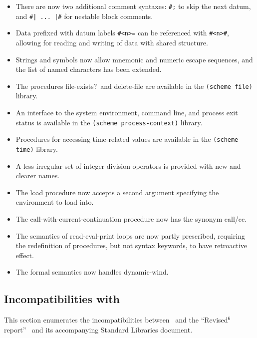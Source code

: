 \begin{itemize}
\item There are now two additional comment syntaxes: {\tt \#;} to
skip the next datum, and {\tt \#| ... |\#}
for nestable block comments.

\item Data prefixed with datum labels {\tt \#<n>=} can be referenced
with {\tt \#<n>\#}, allowing for reading and writing of data with
shared structure.

\item Strings and symbols now allow mnemonic and numeric escape
sequences, and the list of named characters has been extended.

\item The procedures {\cf file-exists?}\ and {\cf delete-file} are available in the
{\tt (scheme file)} library.

\item An interface to the system environment, command line, and process exit status is
available in the {\tt (scheme process-context)} library.

\item Procedures for accessing time-related values are available in the
{\tt (scheme time)} library.

\item A less irregular set of integer division operators is provided
with new and clearer names.

\item The {\cf load} procedure now accepts a second argument specifying the environment to
load into.

\item The {\cf call-with-current-continuation} procedure now has the synonym
{\cf call/cc}.

\item The semantics of read-eval-print loops are now partly prescribed,
requiring the redefinition of procedures, but not syntax keywords, to have retroactive effect.

\item The formal semantics now handles {\cf dynamic-wind}.
\end{itemize}

\subsection*{Incompatibilities with \rsixrs}
This section enumerates the incompatibilities between \rsevenrs~and
the ``Revised$^6$ report''~\cite{R6RS} and its accompanying Standard Libraries document.

